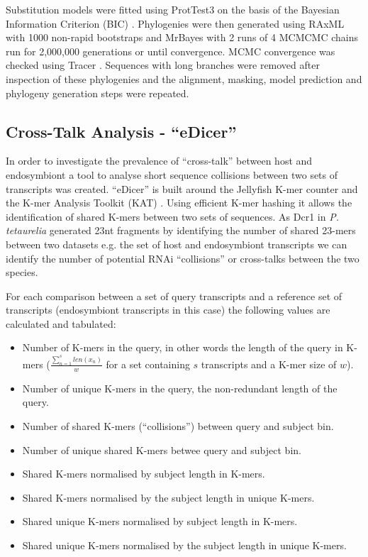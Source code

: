 Substitution models were fitted using ProtTest3 on the basis of the Bayesian
Information Criterion (BIC) \citep{Darriba2011c}.
Phylogenies were then generated using RAxML with 1000 non-rapid bootstraps and MrBayes 
with 2 runs of 4 MCMCMC chains run for 2,000,000 generations or until convergence.
MCMC convergence was checked using Tracer \citep{rambaut2007tracer}.
Sequences with long branches were removed after inspection of these phylogenies
and the alignment, masking, model prediction and phylogeny generation steps
were repeated.

\subsection{Cross-Talk Analysis - ``eDicer''}

In order to investigate the prevalence of ``cross-talk'' between 
host and endosymbiont a tool to analyse short sequence collisions between two sets
of transcripts was created.  ``eDicer'' is built around 
the Jellyfish K-mer counter \citep{Marcais2011} 
and the K-mer Analysis Toolkit (KAT) \citep{ClavijoKAT}.  Using efficient
K-mer hashing it allows the identification of shared K-mers between
two sets of sequences.  As Dcr1 in \textit{P. tetaurelia} generated
23nt fragments by identifying the number of shared 23-mers between
two datasets e.g. the set of host and endosymbiont transcripts 
we can identify the number of potential RNAi ``collisions'' or cross-talks
between the two species. 

For each comparison between a set of query transcripts and a reference
set of transcripts (endosymbiont transcripts in this case)
the following
values are calculated and tabulated:
\begin{itemize}
    \item Number of K-mers in the query, in other words the length of the query
        in K-mers (\(\frac{\sum^s_{n=1} len(x_{n})}{w}\)
        for a set containing \(s\) transcripts and a K-mer size of \(w\)).
    \item Number of unique K-mers in the query, the non-redundant length of 
        the query.
    \item Number of shared  K-mers (``collisions'') between query and subject bin.
    \item Number of unique shared K-mers betwee query and subject bin.
    \item Shared K-mers normalised by subject length in K-mers.
    \item Shared K-mers normalised by the subject length in unique K-mers.
    \item Shared unique K-mers normalised by subject length in K-mers.
    \item Shared unique K-mers normalised by the subject length in unique K-mers.
\end{itemize}

